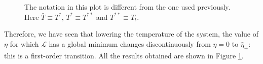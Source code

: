 \documentclass[../main/main.tex]{subfiles}
\begin{document}
\begin{itemize}
  \begin{figure}[h!]
  \begin{minipage}[c]{0.55\linewidth}
  \end{minipage}
  \begin{minipage}[]{0.55\linewidth}
  \centering
  \end{minipage}
  \caption{\label{fig:16_p} The notation in this plot is different from the one used previously. Here \( \bar{T} \equiv T^*  \), \( T^{*} \equiv T^{**} \) and \( T^{**} \equiv T_t \).  }
  \end{figure}

Therefore, we have seen that lowering the temperature of the system, the value of \( \eta  \) for which \( \mathcal{L} \) has a global minimum changes discontinuously from \( \eta =0 \)  to \( \bar{\eta }_+  \): this is a first-order transition. All the results obtained are shown in Figure \ref{fig:16_p}.

\end{itemize}
\end{document}
